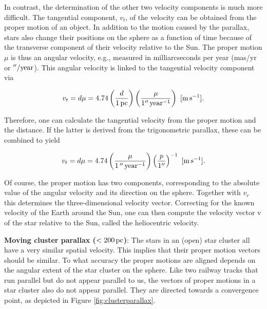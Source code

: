 \documentclass[a4paper,10pt]{article}
\begin{document}
{\noindent}In contrast, the determination of the other two velocity components is much more difficult. The tangential component, $v_t$, of the velocity can be obtained from the proper motion of an object. In addition to the motion caused by the parallax, stars also change their positions on the sphere as a function of time because of the transverse component of their velocity relative to the Sun. The proper motion $\mu$ is thus an angular velocity, e.g., measured in milliarcseconds per year (mas/yr or $''/{\rm year}$). This angular velocity is linked to the tangential velocity component via

\begin{align*}
    v_t = d\mu = 4.74\left(\frac{d}{1\,{\rm pc}}\right) \left(\frac{\mu}{1''\,{\rm year^{-1}}}\right) ~ [{\rm m\,s^{-1}}].
\end{align*}

{\noindent}Therefore, one can calculate the tangential velocity from the proper motion and the distance. If the latter is derived from the trigonometric parallax, these can be combined to yield

\begin{align*}
    v_t = d\mu = 4.74 \left(\frac{\mu}{1\,''\,{\rm year^{-1}}}\right) \left(\frac{p}{1''}\right)^{-1} ~ [{\rm m\,s^{-1}}].
\end{align*}

{\noindent}Of course, the proper motion has two components, corresponding to the absolute value of the angular velocity and its direction on the sphere. Together with $v_r$ this determines the three-dimensional velocity vector. Correcting for the known velocity of the Earth around the Sun, one can then compute the velocity vector v of the star relative to the Sun, called the heliocentric velocity.

{\noindent}\textbf{Moving cluster parallax ($<200\,{\rm pc}$)}: The stars in an (open) star cluster all have a very similar spatial velocity. This implies that their proper motion vectors should be similar. To what accuracy the proper motions are aligned depends on the angular extent of the star cluster on the sphere. Like two railway tracks that run parallel but do not appear parallel to us, the vectors of proper motions in a star cluster also do not appear parallel. They are directed towards a convergence point, as depicted in Figure \ref{fig:clusterparallax}.
\end{document}
